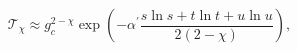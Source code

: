 \begin{equation}
\mathcal{T}_{\chi }\approx g_{c}^{2-\chi }\exp (-\alpha ^{\prime }\frac{s\ln
s+t\ln t+u\ln u}{2(2-\chi )}),
\end{equation}%
